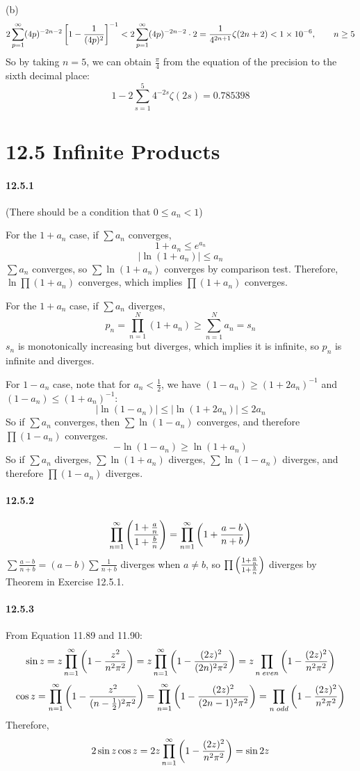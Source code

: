 \documentclass[a4paper]{article}
\begin{document}
(b)
\[
2\sum_{p=1}^\infty(4p)^{-2n-2}\left[1-\frac{1}{(4p)^2} \right]^{-1}<2\sum_{p=1}^\infty(4p)^{-2n-2}\cdot2=\frac{1}{4^{2n+1}}\zeta(2n+2)<1\times10^{-6},\qquad n\geq5
\]
So by taking $n=5$, we can obtain $\frac{\pi}{4}$ from the equation of the precision to the sixth decimal place:
\[
1-2\sum_{s=1}^5 4^{-2s}\zeta(2s)=0.785398
\]

\section*{12.5 Infinite Products}

\paragraph{12.5.1}
(There should be a condition that $0\leq a_n<1$)

For the $1+a_n$ case, if $\sum a_n$ converges,
\[
1+a_n\leq e^{a_n}
\]
\[
|\ln(1+a_n)|\leq a_n
\]
$\sum a_n$ converges, so $\sum\ln(1+a_n)$ converges by comparison test. Therefore, $\ln\prod(1+a_n)$ converges, which implies $\prod(1+a_n)$ converges.
\medskip

For the $1+a_n$ case, if $\sum a_n$ diverges, 
\[
p_n=\prod_{n=1}^N(1+a_n)\geq\sum_{n=1}^N a_n=s_n
\]
$s_n$ is monotonically increasing but diverges, which implies it is infinite, so $p_n$ is infinite and diverges.
\medskip

For $1-a_n$ case, note that for $a_n<\frac{1}{2}$, we have $(1-a_n)\geq(1+2a_n)^{-1}$ and $(1-a_n)\leq(1+a_n)^{-1}$:
\[
|\ln(1-a_n)|\leq|\ln(1+2a_n)|\leq 2a_n
\]
So if $\sum a_n$ converges, then $\sum\ln(1-a_n)$ converges, and therefore $\prod(1-a_n)$ converges.
\[
-\ln(1-a_n)\geq\ln(1+a_n)
\]
So if $\sum a_n$ diverges, $\sum\ln(1+a_n)$ diverges, $\sum\ln(1-a_n)$ diverges, and therefore $\prod(1-a_n)$ diverges.

\paragraph{12.5.2}
\[
\prod_{n=1}^\infty\left(\frac{1+\frac{a}{n}}{1+\frac{b}{n}} \right)=\prod_{n=1}^\infty\left(1+\frac{a-b}{n+b} \right)
\]
$\sum\frac{a-b}{n+b}=(a-b)\sum\frac{1}{n+b}$ diverges when $a\neq b$, so $\prod\left(\frac{1+\frac{a}{n}}{1+\frac{b}{n}} \right)$ diverges by Theorem in Exercise 12.5.1.

\paragraph{12.5.3}
From Equation 11.89 and 11.90:
\[
\sin z=z\prod_{n=1}^\infty\left(1-\frac{z^2}{n^2\pi^2} \right) =z\prod_{n=1}^\infty\left(1-\frac{(2z)^2}{(2n)^2\pi^2} \right) =z\prod_{n\;even}\left(1-\frac{(2z)^2}{n^2\pi^2} \right)
\]
\[
\cos z=\prod_{n=1}^\infty\left(1-\frac{z^2}{(n-\frac{1}{2})^2\pi^2} \right)=\prod_{n=1}^\infty\left(1-\frac{(2z)^2}{(2n-1)^2\pi^2} \right) =\prod_{n\;odd}\left(1-\frac{(2z)^2}{n^2\pi^2} \right)
\]
Therefore,
\[
2\sin z\cos z=2z\prod_{n=1}^\infty\left(1-\frac{(2z)^2}{n^2\pi^2} \right)=\sin2z
\]
\end{document}
